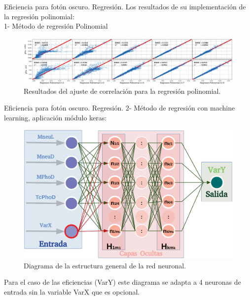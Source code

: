 \begin{frame}{Eficiencia para fot\'on oscuro. Regresi\'on.}
Los resultados de su implementaci\'on de la regresi\'on polinomial:\\
1- M\'etodo de regresi\'on Polinomial

\begin{figure}
\centering
\includegraphics[width=1\textwidth]{Imag/regresionlineal.png}
\caption{Resultados del ajuste de correlaci\'on para la regresi\'on polinomial.}
\end{figure}
\end{frame}



\begin{frame}{Eficiencia para fot\'on oscuro. Regresi\'on.}
2- M\'etodo de regresi\'on con machine learning, aplicaci\'on m\'odulo keras:\\
\begin{figure}
\centering
\includegraphics[width=.6\textwidth]{Imag/neuronas.png}
\caption{Diagrama de la estructura general de la red neuronal.}
\end{figure}
Para el caso de las eficiencias (VarY) este diagrama se adapta a 4 neuronas de entrada sin la variable VarX que es opcional. 
\end{frame}


